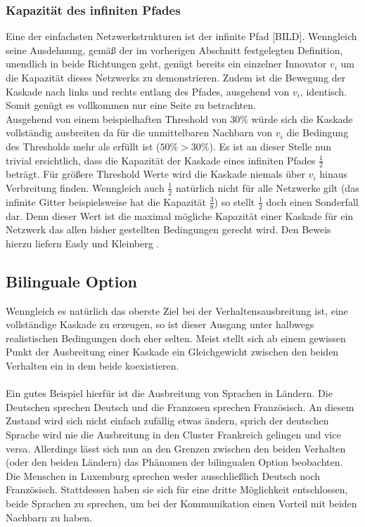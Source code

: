 \documentclass[12pt]{article}
\begin{document}
\subsubsection{Kapazität des infiniten Pfades}
Eine der einfachsten Netzwerkstrukturen ist der infinite Pfad [BILD]. Wenngleich seine Ausdehnung, gemäß der im vorherigen Abschnitt festgelegten Definition, unendlich in beide Richtungen geht, genügt bereits ein einzelner Innovator $v_i$ um die Kapazität dieses Netzwerks zu demonstrieren. Zudem ist die Bewegung der Kaskade nach links und rechts entlang des Pfades, ausgehend von $v_i$, identisch. Somit genügt es vollkommen nur eine Seite zu betrachten.\\
Ausgehend von einem beispielhaften Threshold von $30\%$ würde sich die Kaskade vollständig ausbreiten da für die unmittelbaren Nachbarn von $v_i$ die Bedingung des Thresholds mehr als erfüllt ist ($50\% > 30\%$). Es ist an dieser Stelle nun trivial ersichtlich, dass die Kapazität der Kaskade eines infiniten Pfades $\frac{1}{2}$ beträgt. Für größere Threshold Werte wird die Kaskade niemals über $v_i$ hinaus Verbreitung finden. Wenngleich auch $\frac{1}{2}$ natürlich nicht für alle Netzwerke gilt (das infinite Gitter beispielsweise hat die Kapazität $\frac{3}{8}$) so stellt $\frac{1}{2}$ doch einen Sonderfall dar. Denn dieser Wert ist die maximal mögliche Kapazität einer Kaskade für ein Netzwerk das allen bisher gestellten Bedingungen gerecht wird. Den Beweis hierzu liefern Easly und Kleinberg \cite{Easly10}. 

\subsection{Bilinguale Option}
Wenngleich es natürlich das oberste Ziel bei der Verhaltensausbreitung ist, eine vollständige Kaskade zu erzeugen, so ist dieser Ausgang unter halbwegs realistischen Bedingungen doch eher selten. Meist stellt sich ab einem gewissen Punkt der Ausbreitung einer Kaskade ein Gleichgewicht zwischen den beiden Verhalten ein in dem beide koexistieren.\\\\
Ein gutes Beispiel hierfür ist die Ausbreitung von Sprachen in Ländern. Die Deutschen sprechen Deutsch und die Franzosen sprechen Französisch. An diesem Zustand wird sich nicht einfach zufällig etwas ändern, sprich der deutschen Sprache wird nie die Ausbreitung in den Cluster Frankreich gelingen und vice versa. Allerdings lässt sich nun an den Grenzen zwischen den beiden Verhalten (oder den beiden Ländern) das Phänomen der bilingualen Option beobachten. Die Menschen in Luxemburg sprechen weder ausschließlich Deutsch noch Französisch. Stattdessen haben sie sich für eine dritte Möglichkeit entschlossen, beide Sprachen zu sprechen, um bei der Kommunikation einen Vorteil mit beiden Nachbarn zu haben.
\end{document}
